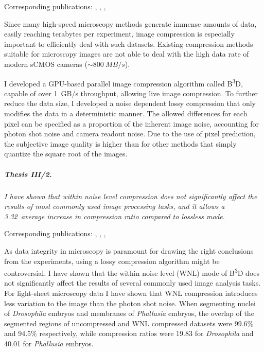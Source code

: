 \documentclass{booklet_style}
\def\b3d{B\textsuperscript{3}D}
\begin{document}
Corresponding publications: \cite{balazs_real-time_2017}, \cite{balazs_gpu-based_2016}, \cite{balazs_gpu-based_2016-1}, \cite{balazs_gpu-based_2017}

Since many high-speed microscopy methods generate immense amounts of data, easily reaching terabytes per experiment, image compression is especially important to efficiently deal with such datasets. Existing compression methods suitable for microscopy images are not able to deal with the high data rate of modern sCMOS cameras ($\sim \SI{800}{MB/s}$).

I developed a GPU-based parallel image compression algorithm called \b3d, capable of over \SI{1}{GB/s} throughput, allowing live image compression. To further reduce the data size, I developed a noise dependent lossy compression that only modifies the data in a deterministic manner. The allowed differences for each pixel can be specified as a proportion of the inherent image noise, accounting for photon shot noise and camera readout noise. Due to the use of pixel prediction, the subjective image quality is higher than for other methods that simply quantize the square root of the images.


\subparagraph{Thesis III/2.} \textit{I have shown that within noise level compression does not significantly affect the results of most commonly used image processing tasks, and it allows a 3.32\texttimes\ average increase in compression ratio compared to lossless mode.}

Corresponding publications: \cite{balazs_real-time_2017}, \cite{balazs_gpu-based_2016}, \cite{balazs_gpu-based_2016-1}, \cite{balazs_gpu-based_2017}

As data integrity in microscopy is paramount for drawing the right conclusions from the experiments, using a lossy compression algorithm might be controversial.
I have shown that the within noise level (WNL) mode of \b3d does not significantly affect the results of several commonly used image analysis tasks. For light-sheet microscopy data I have shown that WNL compression introduces less variation to the image than the photon shot noise. When segmenting nuclei of \textit{Drosophila} embryos and membranes of \textit{Phallusia} embryos, the overlap of the segmented regions of uncompressed and WNL compressed datasets were 99.6\% and 94.5\% respectively, while compression ratios were 19.83 for \textit{Drosophila} and 40.01 for \textit{Phallusia} embryos.
\end{document}
